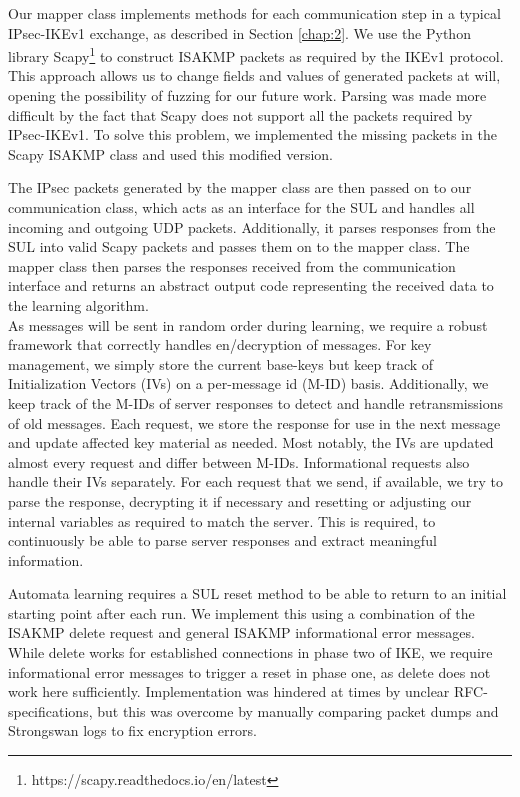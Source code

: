 \documentclass[runningheads]{llncs}
\begin{document}
Our mapper class implements methods for each communication step in a typical IPsec-IKEv1 exchange, as described in Section \ref{chap:2}. We use the Python library Scapy\footnote{https://scapy.readthedocs.io/en/latest} to construct ISAKMP packets as required by the IKEv1 protocol. This approach allows us to change fields and values of generated packets at will, opening the possibility of fuzzing for our future work. Parsing was made more difficult by the fact that Scapy does not support all the packets required by IPsec-IKEv1. To solve this problem, we implemented the missing packets in the Scapy ISAKMP class and used this modified version. 

The IPsec packets generated by the mapper class are then passed on to our communication class, which acts as an interface for the SUL and handles all incoming and outgoing UDP packets. Additionally, it parses responses from the SUL into valid Scapy packets and passes them on to the mapper class. The mapper class then parses the responses received from the communication interface and returns an abstract output code representing the received data to the learning algorithm. \\

As messages will be sent in random order during learning, we require a robust framework that correctly handles en/decryption of messages. For key management, we simply store the current base-keys but keep track of Initialization Vectors (IVs) on a per-message id (M-ID) basis. Additionally, we keep track of the M-IDs of server responses to detect and handle retransmissions of old messages. Each request, we store the response for use in the next message and update affected key material as needed. Most notably, the IVs are updated almost every request and differ between M-IDs. Informational requests also handle their IVs separately. For each request that we send, if available, we try to parse the response, decrypting it if necessary and resetting or adjusting our internal variables as required to match the server. This is required, to continuously be able to parse server responses and extract meaningful information.

Automata learning requires a SUL reset method to be able to return to an initial starting point after each run. We implement this using a combination of the ISAKMP delete request and general ISAKMP informational error messages. While delete works for established connections in phase two of IKE, we require informational error messages to trigger a reset in phase one, as delete does not work here sufficiently. Implementation was hindered at times by unclear RFC-specifications, but this was overcome by manually comparing packet dumps and Strongswan logs to fix encryption errors.\\
\end{document}
